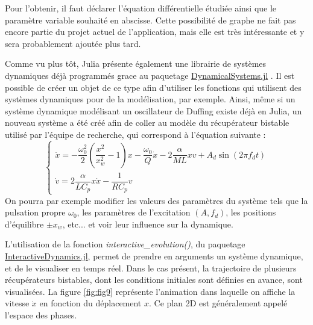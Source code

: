 \documentclass[a4paper, french, 12pt, titlepage]{article}
\begin{document}
Pour l'obtenir, il faut déclarer l'équation différentielle étudiée ainsi que le paramètre variable souhaité en abscisse.
Cette possibilité de graphe ne fait pas encore partie du projet actuel de l'application, mais elle est très intéressante et y sera probablement ajoutée plus tard.

Comme vu plus tôt, Julia présente également une librairie de systèmes dynamiques déjà programmés grace au paquetage \href{https://juliadynamics.github.io/DynamicalSystems.jl/latest/}{DynamicalSystems.jl} \cite{Datseris2018}.
Il est possible de créer un objet de ce type afin d'utiliser les fonctions qui utilisent des systèmes dynamiques pour de la modélisation, par exemple.
Ainsi, même si un système dynamique modélisant un oscillateur de Duffing existe déjà en Julia, un nouveau système a été créé afin de coller au modèle du récupérateur bistable utilisé par l'équipe de recherche, qui correspond à l'équation suivante : 
\begin{equation}
  \left\{
  \begin{array}{ll}
    \ddot{x} = -\dfrac{\omega_0^2}{2} \left( \dfrac{x^2}{x_w^2} - 1 \right) x - \dfrac{\omega_0}{Q} \dot{x} - 2 \dfrac{\alpha}{M L} x v + A_d \sin(2 \pi f_d t) \\[5mm]
    \dot{v} =   2 \dfrac{\alpha}{LC_p} x \dot{x} - \dfrac{1}{R C_p} v
  \end{array}
  \right.
\end{equation}
On pourra par exemple modifier les valeurs des paramètres du système tels que la pulsation propre $\omega_0$, les paramètres de l'excitation $(A, f_d)$, les positions d'équilibre $\pm x_w$, etc... et voir leur influence sur la dynamique.


L'utilisation de la fonction \emph{interactive\_evolution()}, du paquetage \href{https://juliadynamics.github.io/InteractiveDynamics.jl/dev/}{InteractiveDynamics.jl}, permet de prendre en arguments un système dynamique, et de le visualiser en temps réel.
Dans le cas présent, la trajectoire de plusieurs récupérateurs bistables, dont les conditions initiales sont définies en avance, sont visualisées.
La figure \ref{fig:fig9} représente l'animation dans laquelle on affiche la vitesse $\dot{x}$ en fonction du déplacement $x$.
Ce plan 2D est généralement appelé l'espace des phases.
\end{document}
